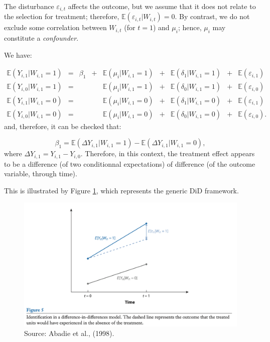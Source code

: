 \documentclass[
  12pt,
]{book}
\theoremstyle{definition}
\theoremstyle{definition}
\theoremstyle{definition}
\theoremstyle{definition}
\theoremstyle{remark}
\begin{document}
The disturbance \(\varepsilon_{i,t}\) affects the outcome, but we assume that it does not relate to the selection for treatment; therefore, \(\mathbb{E}(\varepsilon_{i,t}|W_{i,t})=0\). By contrast, we do not exclude some correlation between \(W_{i,t}\) (for \(t=1\)) and \(\mu_i\); hence, \(\mu_i\) may constitute a \emph{confounder}.

We have:

\[
\begin{array}{cccccccccc}
\mathbb{E}(Y_{i,1}|W_{i,1}=1) &=& \beta_1 &+& \mathbb{E}(\mu_i|W_{i,1}=1) &+&\mathbb{E}(\delta_1|W_{i,1}=1) &+& \mathbb{E}(\varepsilon_{i,1}) \\
\mathbb{E}(Y_{i,0}|W_{i,1}=1) &=&  && \mathbb{E}(\mu_i|W_{i,1}=1) &+&\mathbb{E}(\delta_0|W_{i,1}=1) &+& \mathbb{E}(\varepsilon_{i,0}) \\
\mathbb{E}(Y_{i,1}|W_{i,1}=0) &=& && \mathbb{E}(\mu_i|W_{i,1}=0) &+&\mathbb{E}(\delta_1|W_{i,1}=0) &+& \mathbb{E}(\varepsilon_{i,1}) \\
\mathbb{E}(Y_{i,0}|W_{i,1}=0) &=&  && \mathbb{E}(\mu_i|W_{i,1}=0) &+&\mathbb{E}(\delta_0|W_{i,1}=0) &+& \mathbb{E}(\varepsilon_{i,0}).
\end{array}
\]
and, therefore, it can be checked that:

\[
\beta_1 = \mathbb{E}(\Delta Y_{i,1}|W_{i,1}=1) - \mathbb{E}(\Delta Y_{i,1}|W_{i,1}=0),
\]
where \(\Delta Y_{i,1}=Y_{i,1}-Y_{i,0}\). Therefore, in this context, the treatment effect appears to be a difference (of two conditionnal expectations) of difference (of the outcome variable, through time).

This is illustrated by Figure \ref{fig:figAbadie}, which represents the generic DiD framework.

\begin{figure}
\includegraphics[width=0.95\linewidth]{images/Abadie_et_al_2018} \caption{Source: Abadie et al., (1998).}\label{fig:figAbadie}
\end{figure}
\end{document}
